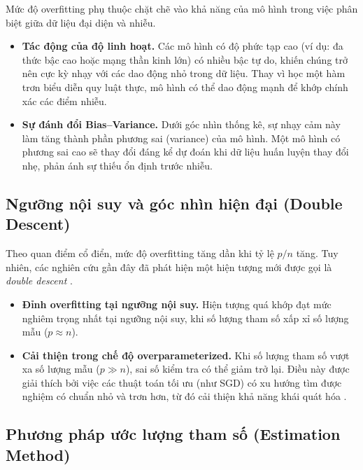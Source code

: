 Mức độ overfitting phụ thuộc chặt chẽ vào khả năng của mô hình trong việc phân biệt giữa dữ liệu đại diện và nhiễu.

\begin{itemize}
    \item \textbf{Tác động của độ linh hoạt.} Các mô hình có độ phức tạp cao (ví dụ: đa thức bậc cao hoặc mạng thần kinh lớn) có nhiều bậc tự do, khiến chúng trở nên cực kỳ nhạy với các dao động nhỏ trong dữ liệu. Thay vì học một hàm trơn biểu diễn quy luật thực, mô hình có thể dao động mạnh để khớp chính xác các điểm nhiễu\cite[pp.~4--12]{Bishop2006}.
    
    \item \textbf{Sự đánh đổi Bias--Variance.} Dưới góc nhìn thống kê, sự nhạy cảm này làm tăng thành phần phương sai (variance) của mô hình. Một mô hình có phương sai cao sẽ thay đổi đáng kể dự đoán khi dữ liệu huấn luyện thay đổi nhẹ, phản ánh sự thiếu ổn định trước nhiễu.\cite{Dar2021}
\end{itemize}

\subsection{Ngưỡng nội suy và góc nhìn hiện đại (Double Descent)}

Theo quan điểm cổ điển, mức độ overfitting tăng dần khi tỷ lệ $p/n$ tăng. Tuy nhiên, các nghiên cứu gần đây đã phát hiện một hiện tượng mới được gọi là \textit{double descent} \cite{double_descent_2021}.

\begin{itemize}
    \item \textbf{Đỉnh overfitting tại ngưỡng nội suy.} Hiện tượng quá khớp đạt mức nghiêm trọng nhất tại ngưỡng nội suy, khi số lượng tham số xấp xỉ số lượng mẫu ($p \approx n$).
    
    \item \textbf{Cải thiện trong chế độ overparameterized.} Khi số lượng tham số vượt xa số lượng mẫu ($p \gg n$), sai số kiểm tra có thể giảm trở lại. Điều này được giải thích bởi việc các thuật toán tối ưu (như SGD) có xu hướng tìm được nghiệm có chuẩn nhỏ và trơn hơn, từ đó cải thiện khả năng khái quát hóa \cite{belkin2019reconciling}.
\end{itemize}

\subsection{Phương pháp ước lượng tham số (Estimation Method)}

